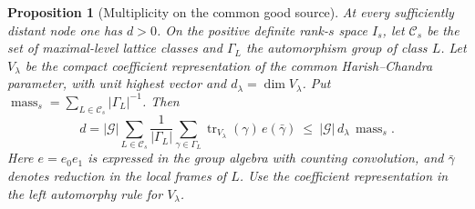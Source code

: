 \documentclass[a4paper,11pt]{article}
\newtheorem{proposition}{Proposition}[section]
\theoremstyle{definition}
\theoremstyle{remark}
\numberwithin{equation}{section}
\begin{document}
\begin{proposition}[Multiplicity on the common good source]
\leavevmode\label{prop:goodmass868}
At every sufficiently distant node one has \(d>0\).
On the positive definite rank-\(s\) space \(I_s\), let
\(\mathcal C_s\) be the set of maximal-level lattice classes
and \(\Gamma_L\) the automorphism group of class \(L\).
Let \(V_\lambda\) be the compact coefficient representation
of the common Harish--Chandra parameter, with unit highest
vector and \(d_\lambda=\dim V_\lambda\). Put
\(\operatorname{mass}_s=\sum_{L\in\mathcal C_s}|\Gamma_L|^{-1}\).
Then
\begin{equation}
 d=|\mathcal G|\sum_{L\in\mathcal C_s}\frac1{|\Gamma_L|}
        \sum_{\gamma\in\Gamma_L}
            \operatorname{tr}_{V_\lambda}(\gamma)\,
                      e(\bar\gamma)
 \ \le\ |\mathcal G|\,d_\lambda\,\operatorname{mass}_s .
 \label{eq:goodmass868}
\end{equation}
Here \(e=e_0e_1\) is expressed in the group algebra with
counting convolution, and \(\bar\gamma\) denotes reduction
in the local frames of \(L\). Use the coefficient representation
in the left automorphy rule for \(V_\lambda\).
\end{proposition}
\end{document}
